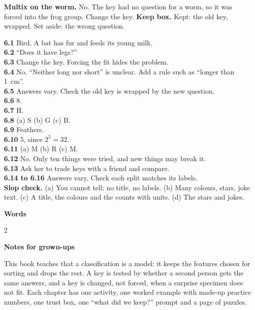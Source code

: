 \textbf{Multix on the worm.} No. The key had no question for a worm, so it was forced into the frog group. Change the key. \textbf{Keep box.} Kept: the old key, wrapped. Set aside: the wrong question.

\textbf{6.1} Bird. A bat has fur and feeds its young milk.\\
\textbf{6.2} ``Does it have legs?''\\
\textbf{6.3} Change the key. Forcing the fit hides the problem.\\
\textbf{6.4} No. ``Neither long nor short'' is unclear. Add a rule such as ``longer than 1~cm''.\\
\textbf{6.5} Answers vary. Check the old key is wrapped by the new question.\\
\textbf{6.6} 8.\\
\textbf{6.7} H.\\
\textbf{6.8} (a) S (b) G (c) B.\\
\textbf{6.9} Feathers.\\
\textbf{6.10} 5, since $2^5=32$.\\
\textbf{6.11} (a) M (b) R (c) M.\\
\textbf{6.12} No. Only ten things were tried, and new things may break it.\\
\textbf{6.13} Ask her to trade keys with a friend and compare.\\
\textbf{6.14 to 6.16} Answers vary. Check each split matches its labels.\\
\textbf{Slop check.} (a) You cannot tell: no title, no labels. (b) Many colours, stars, joke text. (c) A title, the colours and the counts with units. (d) The stars and jokes.

\clearpage\label{notes}
{\sans\bfseries\LARGE\color{ink} Words}\par
\small
\begin{multicols}{2}
\end{multicols}

\vspace{0.4em}
{\sans\bfseries\large\color{sky!70!black} Notes for grown-ups}\par
This book teaches that a classification is a model: it keeps the features chosen for sorting and drops the rest. A key is tested by whether a second person gets the same answers, and a key is changed, not forced, when a surprise specimen does not fit. Each chapter has one activity, one worked example with made-up practice numbers, one trust box, one ``what did we keep?'' prompt and a page of puzzles.


